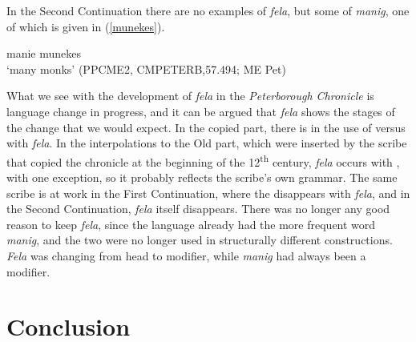 \documentclass[output=paper,colorlinks,citecolor=brown]{langscibook}
\begin{document}
In the Second Continuation there are no examples of \textit{fela}, but some of \textit{manig}, one of which is given in (\ref{munekes}).

\ea\label{munekes}
manie munekes\\
‘many monks’ (PPCME2, CMPETERB,57.494; ME Pet)
\z

What we see with the development of \textit{fela} in the \textit{Peterborough Chronicle} is language change in progress, and it can be argued that \textit{fela} shows the stages of the change that we would expect. In the copied part, there is  in the use of  versus  with \textit{fela}. In the interpolations to the Old  part, which were inserted by the scribe that copied the chronicle at the beginning of the 12\textsuperscript{th} century, \textit{fela} occurs with , with one exception, so it probably reflects the scribe’s own grammar. The same scribe is at work in the First Continuation, where the  disappears with \textit{fela}, and in the Second Continuation, \textit{fela} itself disappears. There was no longer any good reason to keep \textit{fela}, since the language already had the more frequent word \textit{manig}, and the two were no longer used in structurally different constructions. \textit{Fela} was changing from head to modifier, while \textit{manig} had always been a modifier.  

\section{Conclusion}\label{sect:concl}
\end{document}
